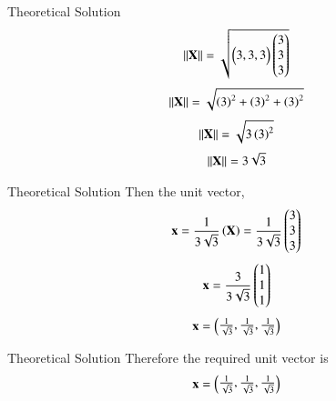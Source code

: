\documentclass{beamer}
\begin{document}
    \begin{frame}{Theoretical Solution}
        \begin{align}
             \left\lVert\mathbf{X}\right\rVert=\sqrt{\begin{pmatrix}3,3,3\end{pmatrix}\begin{pmatrix}3\\3\\3\end{pmatrix}}
         \end{align}
         \begin{align}
             \left\lVert\mathbf{X}\right\rVert=\sqrt{\left(3\right)^2+\left(3\right)^2+\left(3\right)^2}
         \end{align}
         \begin{align}
             \left\lVert\mathbf{X}\right\rVert=\sqrt{3\left(3\right)^2}
         \end{align}
         \begin{align}
             \left\lVert\mathbf{X}\right\rVert=3\sqrt{3}
         \end{align}
    \end{frame}
    \begin{frame}{Theoretical Solution}
        Then the unit vector,\\
         \begin{align}
             \mathbf{x}=\frac{1}{3\sqrt{3}}\left(\mathbf{X}\right)=\frac{1}{3\sqrt{3}}\begin{pmatrix}3\\3\\3\end{pmatrix}
         \end{align}
         \begin{align}
             \mathbf{x}=\frac{3}{3\sqrt{3}}\begin{pmatrix}1\\1\\1\end{pmatrix}
         \end{align}
         \begin{align}
             \mathbf{x}=\begin{pmatrix}\frac{1}{\sqrt{3}},\frac{1}{\sqrt{3}},\frac{1}{\sqrt{3}}\end{pmatrix}
         \end{align}
    \end{frame}
    \begin{frame}{Theoretical Solution}
        Therefore the required unit vector is\\
         \begin{align*}
             \mathbf{x}=\begin{pmatrix}\frac{1}{\sqrt{3}},\frac{1}{\sqrt{3}},\frac{1}{\sqrt{3}}\end{pmatrix}
         \end{align*}
    \end{frame}
	
\end{document}
